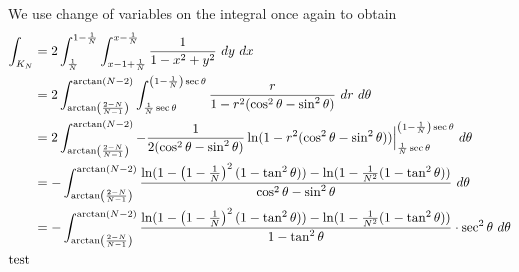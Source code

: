 \documentclass{../../../tex-setup/eh-homework}
\begin{document}
\begin{question}{38}
\[    \]
    We use change of variables on the integral once again to obtain
    \begin{align*}
        \int _{K_N} &= 2\int _{\frac{1}{N}}^{1-\frac{1}{N}} \int _{x - 1 + \frac{1}{N}}^{x-\frac{1}{N}} \frac{1}{1 - x^2 + y^2}\ dy\ dx \\
        &= 2 \int _{\arctan \left( \frac{2-N}{N-1} \right)}^{\arctan (N-2)} \int _{\frac{1}{N}\sec \theta}^{\left( 1-\frac{1}{N} \right)\sec \theta} \frac{r}{1 - r^2(\cos ^2 \theta - \sin ^2 \theta)}\ dr\ d \theta \\
        &= 2 \int _{\arctan \left( \frac{2-N}{N-1} \right)}^{\arctan (N-2)} -\frac{1}{2(\cos ^2 \theta - \sin ^2 \theta)}\ln (1 - r^2(\cos ^2 \theta - \sin ^2 \theta)) \Big| _{\frac{1}{N}\sec \theta}^{\left( 1 - \frac{1}{N} \right)\sec \theta}\ d \theta \\
        &= -\int _{\arctan \left( \frac{2-N}{N-1} \right)}^{\arctan (N-2)} \frac{\ln (1 - \left( 1 - \frac{1}{N} \right)^2(1 - \tan ^2 \theta)) - \ln (1 - \frac{1}{N^2}(1 - \tan ^2 \theta))}{\cos ^2 \theta - \sin ^2 \theta}\ d \theta \\
        &= -\int _{\arctan \left( \frac{2-N}{N-1} \right)}^{\arctan (N-2)} \frac{\ln (1 - \left( 1 - \frac{1}{N} \right)^2(1 - \tan ^2 \theta)) - \ln (1 - \frac{1}{N^2}(1 - \tan ^2 \theta))}{1 - \tan ^2 \theta}\cdot \sec ^2 \theta\ d \theta \\
        \intertext{test}
    \end{align*}
    \end{question}
\end{document}
